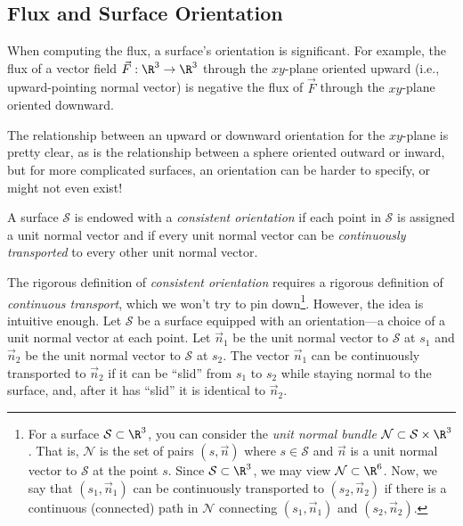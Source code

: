 \subsection{Flux and Surface Orientation}

When computing the flux, a surface's orientation is significant.
For example, the flux of a vector field $\vec F:\R^3\to\R^3$ through
the $xy$-plane oriented upward (i.e., upward-pointing normal vector)
is negative the flux of $\vec F$
through the $xy$-plane oriented downward.

The relationship between an upward or downward orientation for
the $xy$-plane is pretty clear, as is the relationship between a sphere
oriented outward or inward, but for more complicated surfaces, an orientation
can be harder to specify, or might not even exist!

\begin{definition}
	A surface $\mathcal S$ is endowed with a \emph{consistent orientation}
	if each point in $\mathcal S$ is assigned a unit normal vector and
	if every unit normal vector can be \emph{continuously transported} to every
	other unit normal vector.
\end{definition}

The rigorous definition of \emph{consistent orientation} requires a rigorous
definition of \emph{continuous transport}, which we won't try to pin down\footnote{
	For a surface $\mathcal S\subset \R^3$, you can consider the
	\emph{unit normal bundle} $\mathcal N\subset \mathcal S\times \R^3$.  That is,
	$\mathcal N$ is the set of pairs $(s,\vec n)$ where $s\in\mathcal S$ and
	$\vec n$ is a unit normal vector to $\mathcal S$ at the point $s$.  Since
	$\mathcal S\subset \R^3$, we may view $\mathcal N\subset \R^6$.  Now, we say
	that $(s_1,\vec n_1)$ can be continuously transported to $(s_2,\vec n_2)$ if
	there is a continuous (connected) path in $\mathcal N$ connecting $(s_1,\vec n_1)$ and 
	$(s_2,\vec n_2)$.
}.  However,
the idea is intuitive enough.  Let $\mathcal S$
be a surface equipped with an orientation---a choice of a unit normal vector
at each point.  Let $\vec n_1$ be the unit normal vector to $\mathcal S$ at $s_1$
and $\vec n_2$ be the unit normal vector to $\mathcal S$ at $s_2$.  The vector $\vec n_1$
can be continuously transported to $\vec n_2$ if it can be ``slid'' from $s_1$ to $s_2$ while
staying normal to the surface, and, after it has ``slid'' it is identical to $\vec n_2$.

